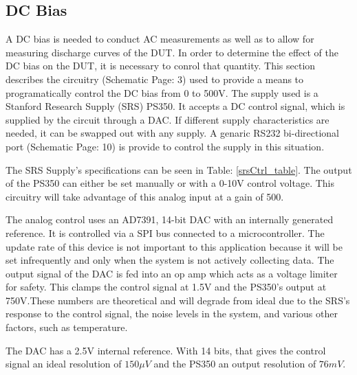 \subsection {DC Bias}

A DC bias is needed to conduct AC measurements as well as to allow for measuring discharge curves of the DUT. In order to determine the effect of the DC bias on the DUT, it is necessary to conrol that quantity. This section describes the circuitry (Schematic Page: 3) used to provide a means to programatically control the DC bias from 0 to 500V. The supply used is a Stanford Research Supply (SRS) PS350. It accepts a DC control signal, which is supplied by the circuit through a DAC. If different supply characteristics are needed, it can be swapped out with any supply. A genaric RS232 bi-directional port (Schematic Page: 10) is provide to control the supply in this situation.



The SRS Supply's specifications can be seen in Table: \ref{srsCtrl_table}. The output of the PS350 can either be set manually or with a 0-10V control voltage. This circuitry will take advantage of this analog input at a gain of 500. 

The analog control uses an AD7391, 14-bit DAC with an internally generated reference. It is controlled via a SPI bus connected to a microcontroller. The update rate of this device is not important to this application because it will be set infrequently and only when the system is not actively collecting data. The output signal of the DAC is fed into an op amp which acts as a voltage limiter for safety. This clamps the control signal at 1.5V and the PS350's output at 750V.These numbers are theoretical and will degrade from ideal due to the SRS's response to the control signal, the noise levels in the system, and various other factors, such as temperature.

The DAC has a 2.5V internal reference. With 14 bits, that gives the control signal an ideal resolution of $150\mu V$ and the PS350 an output resolution of $76mV$.


